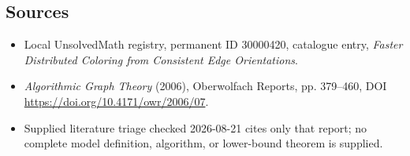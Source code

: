 \documentclass[11pt]{article}
\begin{document}
\subsection{Sources}
\begin{itemize}
\item Local UnsolvedMath registry, permanent ID 30000420, catalogue entry, \emph{Faster Distributed Coloring from Consistent Edge Orientations}.
\item \emph{Algorithmic Graph Theory} (2006), Oberwolfach Reports, pp. 379--460, DOI \url{https://doi.org/10.4171/owr/2006/07}.
\item Supplied literature triage checked 2026-08-21 cites only that report; no complete model definition, algorithm, or lower-bound theorem is supplied.
\end{itemize}
\end{document}
